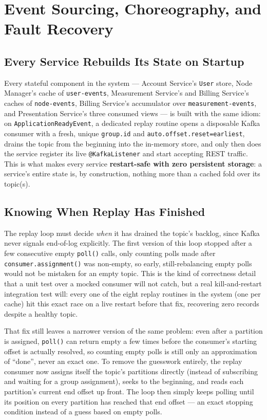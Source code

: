 \section{Event Sourcing, Choreography, and Fault Recovery}

\subsection*{Every Service Rebuilds Its State on Startup}
Every stateful component in the system --- Account Service's \texttt{User} store, Node Manager's
cache of \texttt{user-events}, Measurement Service's and Billing Service's caches of
\texttt{node-events}, Billing Service's accumulator over \texttt{measurement-events}, and
Presentation Service's three consumed views --- is built with the same idiom: on
\texttt{ApplicationReadyEvent}, a dedicated replay routine opens a disposable Kafka consumer with
a fresh, unique \texttt{group.id} and \texttt{auto.offset.reset=earliest}, drains the topic from
the beginning into the in-memory store, and only then does the service register its live
\texttt{@KafkaListener} and start accepting REST traffic. This is what makes every service
\textbf{restart-safe with zero persistent storage}: a service's entire state is, by construction,
nothing more than a cached fold over its topic(s).

\subsection*{Knowing When Replay Has Finished}
The replay loop must decide \emph{when} it has drained the topic's backlog, since Kafka never
signals end-of-log explicitly. The first version of this loop stopped after a few consecutive
empty \texttt{poll()} calls, only counting polls made after \texttt{consumer.assignment()} was
non-empty, so early, still-rebalancing empty polls would not be mistaken for an empty topic. This
is the kind of correctness detail that a unit test over a mocked consumer will not catch, but a
real kill-and-restart integration test will: every one of the eight replay routines in the system
(one per cache) hit this exact race on a live restart before that fix, recovering zero records
despite a healthy topic.

That fix still leaves a narrower version of the same problem: even after a partition is assigned,
\texttt{poll()} can return empty a few times before the consumer's starting offset is actually
resolved, so counting empty polls is still only an approximation of ``done'', never an exact one.
To remove the guesswork entirely, the replay consumer now assigns itself the topic's partitions
directly (instead of subscribing and waiting for a group assignment), seeks to the beginning, and
reads each partition's current end offset up front. The loop then simply keeps polling until its
position on every partition has reached that end offset --- an exact stopping condition instead of
a guess based on empty polls.

